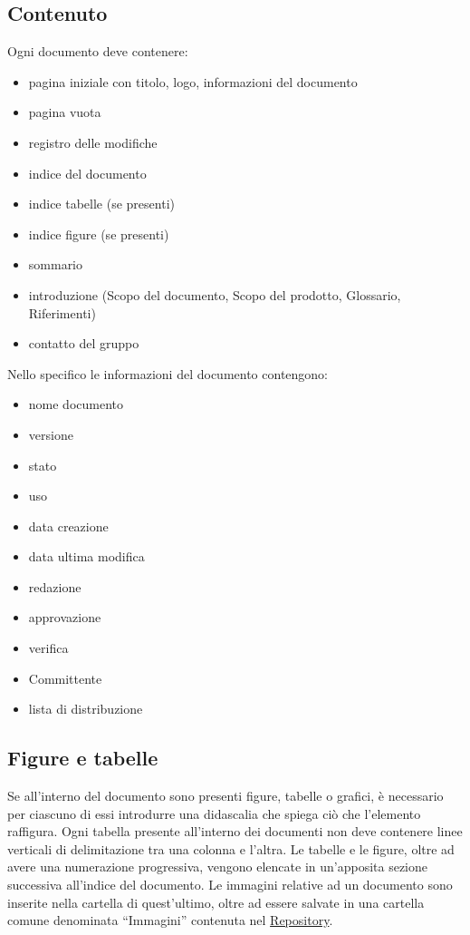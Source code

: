 \documentclass[a4paper,11pt]{article}
\begin{document}
\subsection{Contenuto}
Ogni documento deve contenere:
\begin{itemize}
\item pagina iniziale con titolo, logo, informazioni del documento
\item pagina vuota
\item registro delle modifiche
\item indice del documento
\item indice tabelle (se presenti)
\item indice figure (se presenti)
\item sommario
\item introduzione (Scopo del documento, Scopo del prodotto, Glossario, Riferimenti)
\item contatto del gruppo
\end{itemize}
Nello specifico le informazioni del documento contengono: 
\begin{itemize}
\item nome documento
\item versione
\item stato
\item uso
\item data creazione
\item data ultima modifica
\item redazione
\item approvazione
\item verifica
\item Committente
\item lista di distribuzione
\end{itemize}
\subsection{Figure e tabelle}
Se all'interno del documento sono presenti figure, tabelle o grafici, \`e necessario per ciascuno di essi introdurre una didascalia che spiega ci\`o che l'elemento raffigura. Ogni tabella presente all'interno dei documenti non deve contenere linee verticali di delimitazione tra una colonna e l'altra. Le tabelle e le figure, oltre ad avere una numerazione progressiva, vengono elencate in un'apposita sezione successiva all'indice del documento.
Le immagini relative ad un documento sono inserite  nella cartella di quest'ultimo, oltre ad essere salvate in una cartella comune denominata ``Immagini'' contenuta nel \underline{Repository}.
\end{document}
